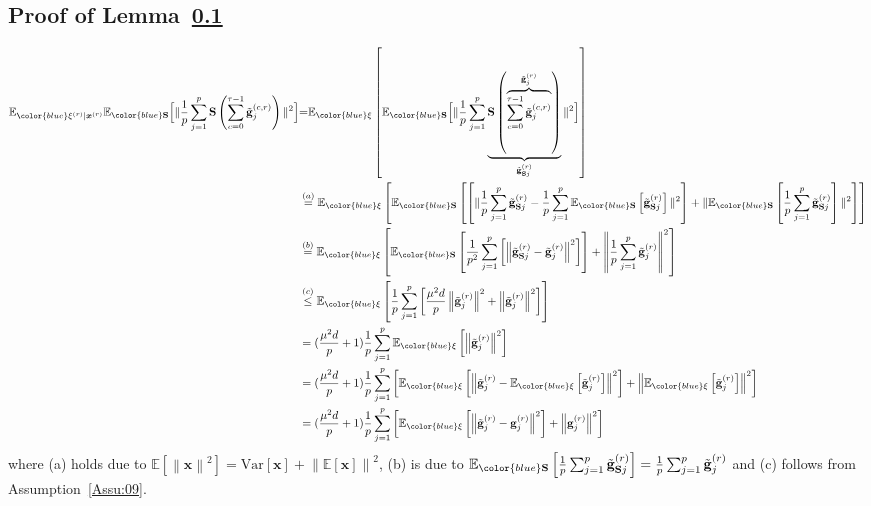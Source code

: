 \subsection{Proof of Lemma~\ref{}}
\begin{align}
\mathbb{E}_{{\color{blue}\xi^{(r)}|\boldsymbol{x}^{(r)}}}\mathbb{E}_{{\color{blue}\mathbf{S}}}\Big[\|\frac{1}{p}\sum_{j=1}^p \mathbf{S}\left(\sum_{c=0}^{\tau-1}\tilde{\mathbf{g}}^{(c,r)}_j\right)\|^2\Big]&{=} \mathbb{E}_{{\color{blue}\xi}}\left[\mathbb{E}_{{\color{blue}\mathbf{S}}}\Big[\|\frac{1}{p}\sum_{j=1}^p\underbrace{\mathbf{S}\left(\overbrace{\sum_{c=0}^{\tau-1}\tilde{\mathbf{g}}^{(c,r)}_j}^{\tilde{\mathbf{g}}_j^{(r)}}\right)}_{\tilde{\mathbf{g}}_{\mathbf{S}j}^{(r)}}\|^2\Big]\right]\nonumber\\
&\stackrel{(a)}{=}\mathbb{E}_{{\color{blue}\xi}}\left[\mathbb{E}_{{\color{blue}\mathbf{S}}}\left[\left[\|\frac{1}{p}\sum_{j=1}^p\tilde{\mathbf{g}}_{\mathbf{S}j}^{(r)}-\frac{1}{p}\sum_{j=1}^p\mathbb{E}_{{\color{blue}\mathbf{S}}}\left[\tilde{\mathbf{g}}_{\mathbf{S}j}^{(r)}\right]\|^2\right]+\|\mathbb{E}_{{\color{blue}\mathbf{S}}}\left[\frac{1}{p}\sum_{j=1}^p\tilde{\mathbf{g}}_{\mathbf{S}j}^{(r)}\right]\|^2\right]\right]\nonumber\\
&\stackrel{(b)}{=}\mathbb{E}_{{\color{blue}\xi}}\left[\mathbb{E}_{{\color{blue}\mathbf{S}}}\left[\frac{1}{p^2}\sum_{j=1}^p\left[\left\|\tilde{\mathbf{g}}_{\mathbf{S}j}^{(r)}-\tilde{\mathbf{g}}^{(r)}_j\right\|^2\right]\right]+\left\|\frac{1}{p}\sum_{j=1}^p\tilde{\mathbf{g}}_j^{(r)}\right\|^2\right]\nonumber\\
&\stackrel{(c)}{\leq}\mathbb{E}_{{\color{blue}\xi}}\left[\frac{1}{p}\sum_{j=1}^p\left[\frac{\mu^2 d}{p}\left\|\tilde{\mathbf{g}}_j^{(r)}\right\|^2+\left\|\tilde{\mathbf{g}}_j^{(r)}\right\|^2\right]\right]\nonumber\\
&=(\frac{\mu^2 d}{p}+1)\frac{1}{p}\sum_{j=1}^p\mathbb{E}_{{\color{blue}\xi}}\left[\left\|\tilde{\mathbf{g}}_j^{(r)}\right\|^2\right]\nonumber\\
&=(\frac{\mu^2 d}{p}+1)\frac{1}{p}\sum_{j=1}^p\left[\mathbb{E}_{{\color{blue}\xi}}\left[\left\|\tilde{\mathbf{g}}_j^{(r)}-\mathbb{E}_{{\color{blue}\xi}}\left[\tilde{\mathbf{g}}_j^{(r)}\right]\right\|^2\right]+\left\|\mathbb{E}_{{\color{blue}\xi}}\left[\tilde{\mathbf{g}}_j^{(r)}\right]\right\|^2\right]\nonumber\\
&=(\frac{\mu^2 d}{p}+1)\frac{1}{p}\sum_{j=1}^p\left[\mathbb{E}_{{\color{blue}\xi}}\left[\left\|\tilde{\mathbf{g}}_j^{(r)}-{\mathbf{g}}_j^{(r)}\right\|^2\right]+\left\|{\mathbf{g}}_j^{(r)}\right\|^2\right]\label{eq:lemma1}
\end{align}
where (a) holds due to $\mathbb{E}\left[\left\|\mathbf{x}\right\|^2\right]=\text{Var}[\mathbf{x}]+\left\|\mathbb{E}[\mathbf{x}]\right\|^2$, (b) is due to $\mathbb{E}_{{\color{blue}\mathbf{S}}}\left[\frac{1}{p}\sum_{j=1}^p\tilde{\mathbf{g}}_{\mathbf{S}j}^{(r)}\right]=\frac{1}{p}\sum_{j=1}^p\tilde{\mathbf{g}}_{j}^{(r)}$ and (c) follows from Assumption~\ref{Assu:09}.



